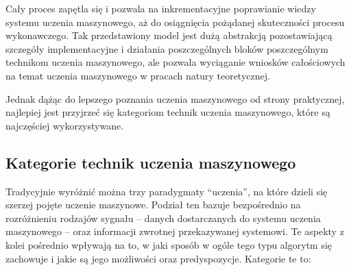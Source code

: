Cały proces zapętla się i pozwala na inkrementacyjne poprawianie wiedzy systemu uczenia maszynowego, aż do osiągnięcia pożądanej skuteczności procesu wykonawczego.
Tak przedstawiony model jest dużą abstrakcją pozostawiającą szczegóły implementacyjne i działania poszczególnych bloków poszczególnym technikom uczenia maszynowego, ale pozwala wyciąganie wniosków całościowych na temat uczenia maszynowego w pracach natury teoretycznej.

Jednak dążąc do lepszego poznania uczenia maszynowego od strony praktycznej, najlepiej jest przyjrzeć się kategoriom technik uczenia maszynowego, które są najczęściej wykorzystywane.

\subsection{Kategorie technik uczenia maszynowego}

Tradycyjnie wyróżnić można trzy paradygmaty ``uczenia'', na które dzieli się szerzej pojęte uczenie maszynowe.
Podział ten bazuje bezpośrednio na rozróżnieniu rodzajów sygnału -- danych dostarczanych do systemu uczenia maszynowego -- oraz informacji zwrotnej przekazywanej systemowi.
Te aspekty z kolei pośrednio wpływają na to, w jaki sposób w ogóle tego typu algorytm się zachowuje i jakie są jego możliwości oraz predyspozycje.
Kategorie te to:

